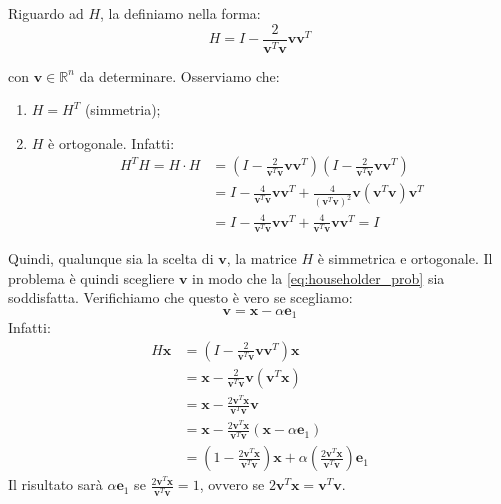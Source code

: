 Riguardo ad $H$, la definiamo nella forma:
\begin{equation} \label{eq:householder_prob2}
    H = I - \frac{2}{\mathbf{v}^T \mathbf{v}} \mathbf{v} \mathbf{v}^T 
\end{equation}

con $\mathbf{v} \in \mathbb{R}^n $ da determinare.
Osserviamo che:
\begin{enumerate}
    \item $H = H^T$ (simmetria);
    \item $H$ è ortogonale. Infatti:
    \begin{align*}
        H^T H = H \cdot H &= \left( I - \frac{2}{\mathbf{v}^T \mathbf{v}} \mathbf{v} \mathbf{v}^T \right) \left( I - \frac{2}{\mathbf{v}^T \mathbf{v}} \mathbf{v} \mathbf{v}^T \right) \\
        &= I - \frac{4}{\mathbf{v}^T \mathbf{v}} \mathbf{v} \mathbf{v}^T + \frac{4}{(\mathbf{v}^T \mathbf{v})^2} \mathbf{v} (\mathbf{v}^T \mathbf{v}) \mathbf{v}^T \\
        &= I - \frac{4}{\mathbf{v}^T \mathbf{v}} \mathbf{v} \mathbf{v}^T + \frac{4}{\mathbf{v}^T \mathbf{v}} \mathbf{v} \mathbf{v}^T = I
    \end{align*}
\end{enumerate}
Quindi, qualunque sia la scelta di $\mathbf{v}$, la matrice $H$ è simmetrica e ortogonale.
Il problema è quindi scegliere $\mathbf{v}$ in modo che la \eqref{eq:householder_prob} sia soddisfatta.
Verifichiamo che questo è vero se scegliamo:
$$ \mathbf{v} = \mathbf{x} - \alpha \mathbf{e}_1 $$
Infatti:
\begin{align*}
    H \mathbf{x} &= \left( I - \frac{2}{\mathbf{v}^T \mathbf{v}} \mathbf{v} \mathbf{v}^T \right) \mathbf{x} \\
    &= \mathbf{x} - \frac{2}{\mathbf{v}^T \mathbf{v}} \mathbf{v} (\mathbf{v}^T \mathbf{x}) \\
    &= \mathbf{x} - \frac{2 \mathbf{v}^T \mathbf{x}}{\mathbf{v}^T \mathbf{v}} \mathbf{v} \\
    &= \mathbf{x} - \frac{2 \mathbf{v}^T \mathbf{x}}{\mathbf{v}^T \mathbf{v}} (\mathbf{x} - \alpha \mathbf{e}_1) \\
    &= \left( 1 - \frac{2 \mathbf{v}^T \mathbf{x}}{\mathbf{v}^T \mathbf{v}} \right) \mathbf{x} + \alpha \left( \frac{2 \mathbf{v}^T \mathbf{x}}{\mathbf{v}^T \mathbf{v}} \right) \mathbf{e}_1
\end{align*}
Il risultato sarà $\alpha \mathbf{e}_1$ se $\frac{2 \mathbf{v}^T \mathbf{x}}{\mathbf{v}^T \mathbf{v}} = 1$, ovvero se $2 \mathbf{v}^T \mathbf{x} = \mathbf{v}^T \mathbf{v}$.

